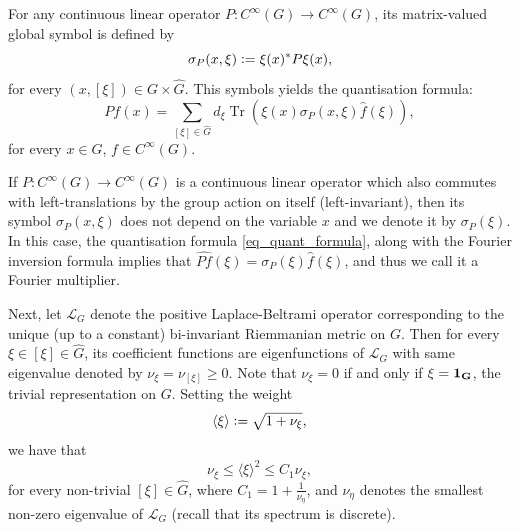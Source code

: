 \documentclass[11pt]{amsart}
\numberwithin{theorem}{section}
\numberwithin{equation}{section}
\theoremstyle{definition}
\numberwithin{example}{section}
\theoremstyle{definition}
\theoremstyle{definition}
\newcommand{\Tr}{\operatorname{Tr}}
\begin{document}
For any continuous linear operator $P:C^\infty(G)\to C^\infty(G)$, its matrix-valued global symbol is defined by
\begin{equation*}
    \sigma_P(x,\xi)\vcentcolon= \xi(x)^*P\xi(x),
\end{equation*}
for every $(x,[\xi])\in G\times \widehat{G}$. This symbols yields the quantisation formula:
\begin{equation}\label{eq_quant_formula}
    Pf(x)=\sum_{[\xi]\in\widehat{G}}d_\xi \Tr\left(\xi(x)\sigma_P(x,\xi)\widehat{f}(\xi)\right),
\end{equation}
for every $x\in G$, $f\in C^\infty(G)$. 

If $P:C^\infty(G)\to C^\infty(G)$ is a continuous linear operator which also commutes with left-translations by the group action on itself (left-invariant), then its symbol $\sigma_P(x,\xi)$ does not depend on the variable $x$ and we denote it by  $\sigma_P(\xi)$. In this case, the quantisation formula \eqref{eq_quant_formula}, along with the Fourier inversion formula implies that $\widehat{Pf}(\xi)=\sigma_P(\xi)\widehat{f}(\xi)$, and thus we call it a Fourier multiplier.

Next, let $\mathcal{L}_G$ denote the positive Laplace-Beltrami operator corresponding to the unique (up to a constant) bi-invariant Riemmanian metric on $G$. Then for every $\xi\in[\xi]\in\widehat{G}$, its coefficient functions are eigenfunctions of $\mathcal{L}_G$ with same eigenvalue denoted by $\nu_\xi=\nu_{[\xi]}\geq 0$. Note that $\nu_\xi=0$ if and only if $\xi={\bf1_G}$, the trivial representation on $G$. Setting the weight
\begin{equation*}
    \langle \xi\rangle\vcentcolon=\sqrt{1+\nu_\xi},
\end{equation*}
we have that 
\begin{equation}\label{def_C1}
    \nu_\xi \leq \langle \xi \rangle^2 \leq C_1\nu_\xi,
\end{equation}
for every non-trivial $[\xi]\in\widehat{G}$,  where $C_1= 1+\frac{1}{\nu_\eta}$, and $\nu_\eta$ denotes the smallest non-zero eigenvalue of $\mathcal{L}_G$ (recall that its spectrum is discrete). 
\end{document}
